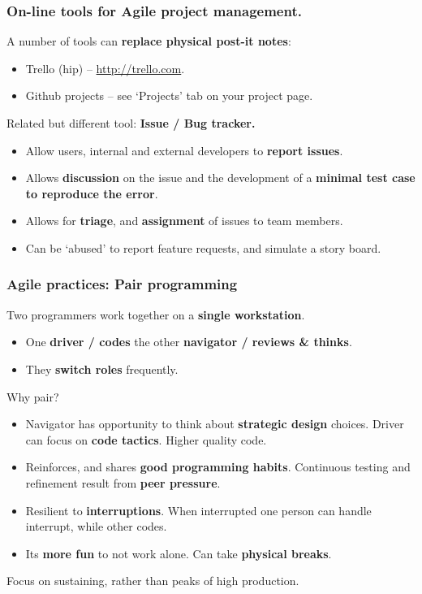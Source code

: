 \documentclass{beamer} %
\newcommand\emc[1]{\textcolor{brightblue}{\textbf{#1}}}
\begin{document}
\begin{frame}

\frametitle{On-line tools for Agile project management.}

A number of tools can \emc{replace physical post-it notes}:
\begin{itemize}
  \item Trello (hip) -- \url{http://trello.com}.
  \item Github projects -- see `Projects' tab on your project page.
\end{itemize}

\vspace{5mm}
Related but different tool: \emc{Issue / Bug tracker.}
\begin{itemize}
  \item Allow users, internal and external developers to \emc{report issues}.
  \item Allows \emc{discussion} on the issue and the development of a \emc{minimal test case to reproduce the error}.
  \item Allows for \emc{triage}, and \emc{assignment} of issues to team members.
  \item Can be `abused' to report feature requests, and simulate a story board.
  \end{itemize}

\end{frame}

\begin{frame}

\frametitle{Agile practices: Pair programming}

Two programmers work together on a \emc{single workstation}. 
\begin{itemize}
\item One \emc{driver / codes} the other \emc{navigator / reviews \& thinks}.
\item They \emc{switch roles} frequently.
\end{itemize}

Why pair?
\begin{itemize}
  \item Navigator has opportunity to think about \emc{strategic design} choices. Driver can focus on  \emc{code tactics}. Higher quality code.
  \item Reinforces, and shares \emc{good programming habits}. Continuous testing and refinement result from \emc{peer pressure}.
  \item Resilient to \emc{interruptions}. When interrupted one person can handle interrupt, while other codes.
  \item Its \emc{more fun} to not work alone. Can take \emc{physical breaks}.
\end{itemize}
Focus on sustaining, rather than peaks of high production.

\end{frame}
\end{document}
